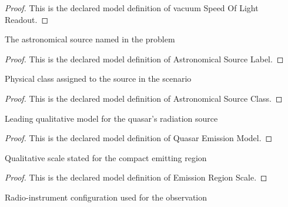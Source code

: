 \begin{proof}
  This is the declared model definition of vacuum Speed Of Light Readout.
\end{proof}
\begin{definition}
  \label{def:physics:phyx-mini-0123:phyxminiproblems-problemphyxmini0123-astronomicalsourcelabel}
  The astronomical source named in the problem
\end{definition}
\begin{proof}
  This is the declared model definition of Astronomical Source Label.
\end{proof}
\begin{definition}
  \label{def:physics:phyx-mini-0123:phyxminiproblems-problemphyxmini0123-astronomicalsourceclass}
  Physical class assigned to the source in the scenario
\end{definition}
\begin{proof}
  This is the declared model definition of Astronomical Source Class.
\end{proof}
\begin{definition}
  \label{def:physics:phyx-mini-0123:phyxminiproblems-problemphyxmini0123-quasaremissionmodel}
  Leading qualitative model for the quasar's radiation source
\end{definition}
\begin{proof}
  This is the declared model definition of Quasar Emission Model.
\end{proof}
\begin{definition}
  \label{def:physics:phyx-mini-0123:phyxminiproblems-problemphyxmini0123-emissionregionscale}
  Qualitative scale stated for the compact emitting region
\end{definition}
\begin{proof}
  This is the declared model definition of Emission Region Scale.
\end{proof}
\begin{definition}
  \label{def:physics:phyx-mini-0123:phyxminiproblems-problemphyxmini0123-radioarrayconfiguration}
  Radio-instrument configuration used for the observation
\end{definition}

